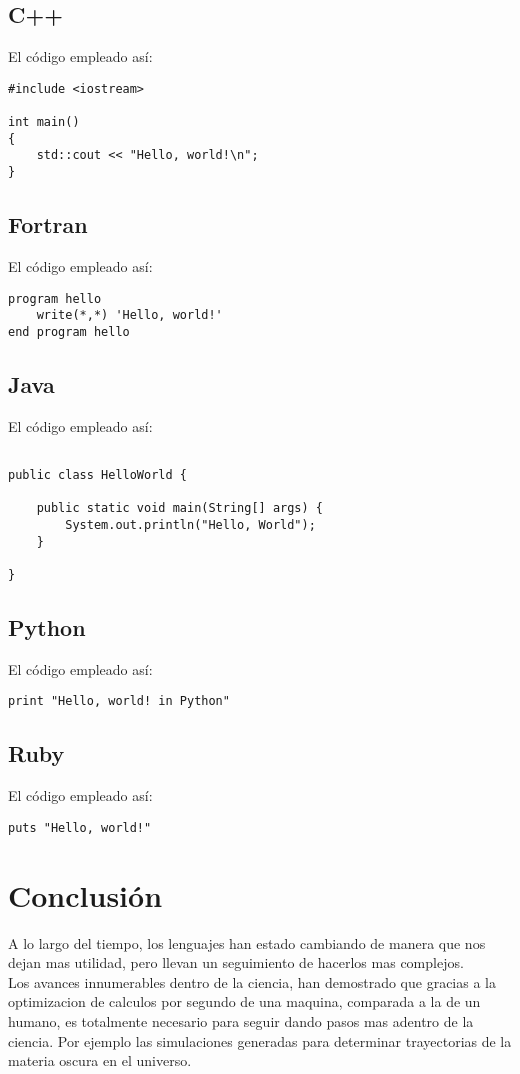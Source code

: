 \documentclass{article}
\begin{document}
\subsection{C++}
El código empleado así:
\begin{verbatim}
#include <iostream>

int main()
{
    std::cout << "Hello, world!\n";
}
\end{verbatim}
\subsection{Fortran}
El código empleado así:
\begin{verbatim}
program hello
    write(*,*) 'Hello, world!'
end program hello
\end{verbatim}
\subsection{Java}
El código empleado así:
\begin{verbatim}

public class HelloWorld {

    public static void main(String[] args) {
        System.out.println("Hello, World");
    }

}
\end{verbatim}
\subsection{Python}
El código empleado así:
\begin{verbatim}
print "Hello, world! in Python"
\end{verbatim}
\subsection{Ruby}
El código empleado así:
\begin{verbatim}
puts "Hello, world!"
\end{verbatim}

\section{Conclusión}
A lo largo del tiempo, los lenguajes han estado cambiando de manera que
nos dejan mas utilidad, pero llevan un seguimiento de hacerlos mas complejos. \\
Los avances innumerables dentro de la ciencia, han demostrado que gracias a la optimizacion de calculos por segundo de una maquina, comparada a la de un humano, es totalmente necesario para seguir dando pasos mas adentro de la ciencia. Por ejemplo las simulaciones generadas para determinar trayectorias de la materia oscura en el universo.
\end{document}
